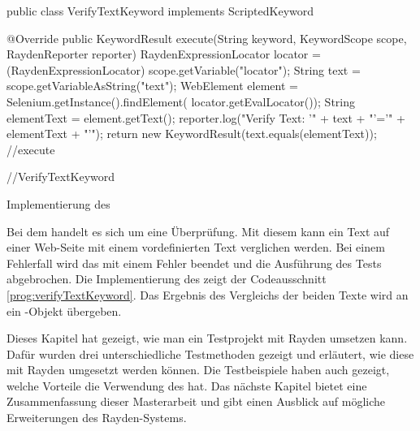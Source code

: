 \begin{program}
\begin{JavaCode}
public class VerifyTextKeyword implements ScriptedKeyword {

  @Override
  public KeywordResult execute(String keyword, KeywordScope scope,
	  RaydenReporter reporter) {
    RaydenExpressionLocator locator = 
		  (RaydenExpressionLocator) scope.getVariable("locator");
    String text = scope.getVariableAsString("text");
    WebElement element = Selenium.getInstance().findElement(
		  locator.getEvalLocator());
    String elementText = element.getText();
    reporter.log("Verify Text: '" + text + "'='" + elementText + "'");
    return new KeywordResult(text.equals(elementText));
  } //execute
	
} //VerifyTextKeyword
\end{JavaCode}
\caption{Implementierung des }
\label{prog:verifyTextKeyword}
\end{program}

\SuperPar
Bei dem   handelt es sich um eine Überprüfung. Mit diesem  kann ein Text auf einer Web-Seite mit einem vordefinierten Text verglichen werden. Bei einem Fehlerfall wird das  mit einem Fehler beendet und die Ausführung des Tests abgebrochen. Die Implementierung des  zeigt der Codeausschnitt \ref{prog:verifyTextKeyword}. Das Ergebnis des Vergleichs der beiden Texte wird an ein -Objekt übergeben. 

\SuperPar
Dieses Kapitel hat gezeigt, wie man ein Testprojekt mit Rayden umsetzen kann. Dafür wurden drei unterschiedliche Testmethoden gezeigt und erläutert, wie diese mit Rayden umgesetzt werden können. Die Testbeispiele haben auch gezeigt, welche Vorteile die Verwendung des  hat. Das nächste Kapitel bietet eine Zusammenfassung dieser Masterarbeit und gibt einen Ausblick auf mögliche Erweiterungen des Rayden-Systems. 
